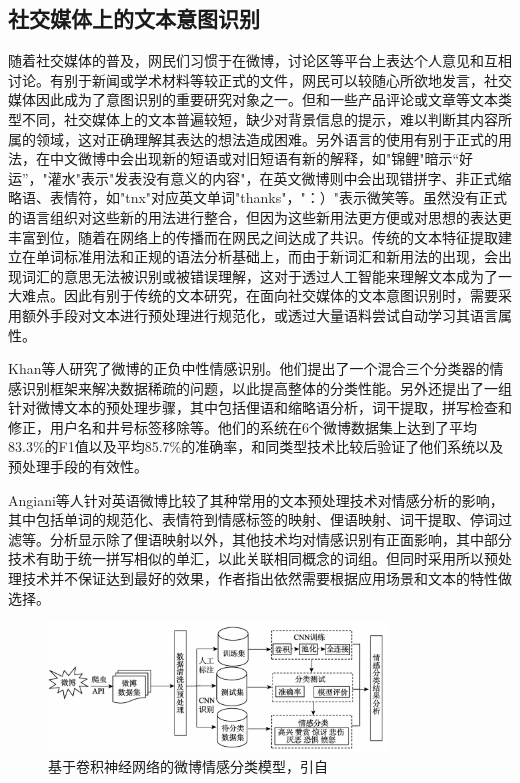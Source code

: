 \subsection{社交媒体上的文本意图识别}

随着社交媒体的普及，网民们习惯于在微博，讨论区等平台上表达个人意见和互相讨论。有别于新闻或学术材料等较正式的文件，网民可以较随心所欲地发言，社交媒体因此成为了意图识别的重要研究对象之一。但和一些产品评论或文章等文本类型不同，社交媒体上的文本普遍较短\cite{Madhusudhanan2018survey}，缺少对背景信息的提示，难以判断其内容所属的领域，这对正确理解其表达的想法造成困难。另外语言的使用有别于正式的用法，在中文微博中会出现新的短语或对旧短语有新的解释\cite{xie2012jiyu}，如"锦鲤"暗示“好运”，"灌水"表示"发表没有意义的内容"，在英文微博则中会出现错拼字、非正式缩略语、表情符\cite{go2009twitter}\cite{paltoglou2012twitter}，如"tnx"对应英文单词"thanks"，"：）"表示微笑等。虽然没有正式的语言组织对这些新的用法进行整合，但因为这些新用法更方便或对思想的表达更丰富到位，随着在网络上的传播而在网民之间达成了共识。传统的文本特征提取建立在单词标准用法和正规的语法分析基础上，而由于新词汇和新用法的出现，会出现词汇的意思无法被识别或被错误理解，这对于透过人工智能来理解文本成为了一大难点。因此有别于传统的文本研究，在面向社交媒体的文本意图识别时，需要采用额外手段对文本进行预处理进行规范化，或透过大量语料尝试自动学习其语言属性。

Khan等人\cite{khan2014tom}研究了微博的正负中性情感识别。他们提出了一个混合三个分类器的情感识别框架来解决数据稀疏的问题，以此提高整体的分类性能。另外还提出了一组针对微博文本的预处理步骤，其中包括俚语和缩略语分析，词干提取，拼写检查和修正，用户名和井号标签移除等。他们的系统在6个微博数据集上达到了平均83.3\%的F1值以及平均85.7\%的准确率，和同类型技术比较后验证了他们系统以及预处理手段的有效性。

Angiani等人\cite{angiani2016comparison}针对英语微博比较了其种常用的文本预处理技术对情感分析的影响，其中包括单词的规范化、表情符到情感标签的映射、俚语映射、词干提取、停词过滤等。分析显示除了俚语映射以外，其他技术均对情感识别有正面影响，其中部分技术有助于统一拼写相似的单汇，以此关联相同概念的词组。但同时采用所以预处理技术并不保证达到最好的效果，作者指出依然需要根据应用场景和文本的特性做选择。

\begin{figure}[H] %
  \centering
  \includegraphics[width=0.8\textwidth]{img/zhang2018jiyu.png}
  \caption{基于卷积神经网络的微博情感分类模型，引自\cite{zhang2018jiyu}}
  \label{fig:zhang2018jiyu}
\end{figure}

